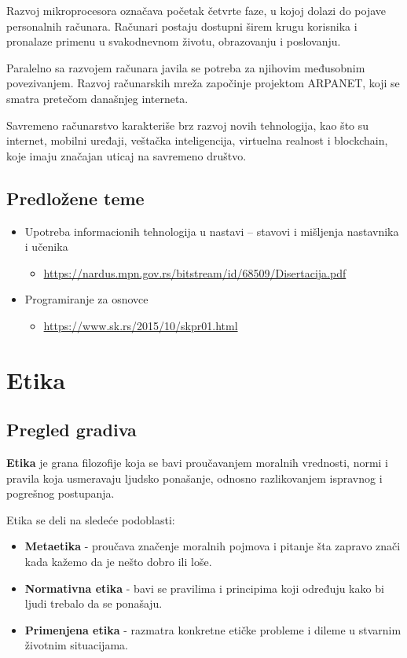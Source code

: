 \documentclass[a4paper, 12pt]{article}
\begin{document}
Razvoj mikroprocesora označava početak četvrte faze, u kojoj dolazi do pojave personalnih
računara. Računari postaju dostupni širem krugu korisnika i pronalaze primenu u svakodnevnom
životu, obrazovanju i poslovanju.

Paralelno sa razvojem računara javila se potreba za njihovim međusobnim povezivanjem.
Razvoj računarskih mreža započinje projektom ARPANET, koji se smatra pretečom današnjeg
interneta. 

Savremeno računarstvo karakteriše brz razvoj novih tehnologija, kao što su
internet, mobilni uređaji, veštačka inteligencija, virtuelna realnost i blockchain, koje
imaju značajan uticaj na savremeno društvo.

\subsection{Predložene teme}
\begin{itemize}
    \item Upotreba informacionih tehnologija u nastavi – stavovi i mišljenja nastavnika i učenika
    \begin{itemize}
        \item \url{https://nardus.mpn.gov.rs/bitstream/id/68509/Disertacija.pdf}
    \end{itemize}
    \item Programiranje za osnovce
    \begin{itemize}
        \item \url{https://www.sk.rs/2015/10/skpr01.html}
    \end{itemize}
    
\end{itemize}

\section{Etika}
\subsection{Pregled gradiva}
\textbf{Etika} je grana filozofije koja se bavi proučavanjem moralnih vrednosti, normi i pravila
koja usmeravaju ljudsko ponašanje, odnosno razlikovanjem ispravnog i pogrešnog
postupanja.

Etika se deli na sledeće podoblasti:
\begin{itemize}
    \item \textbf{Metaetika} - proučava značenje moralnih pojmova i pitanje šta zapravo
    znači kada kažemo da je nešto dobro ili loše.
    \item \textbf{Normativna etika} - bavi se pravilima i principima koji određuju kako bi
    ljudi trebalo da se ponašaju.
    \item \textbf{Primenjena etika} - razmatra konkretne etičke probleme i dileme u
    stvarnim životnim situacijama.
\end{itemize}
\end{document}
